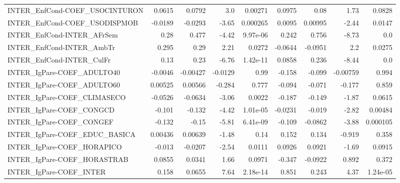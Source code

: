 \begin{tabular}{lrrrrrrrr}
INTER\_EnfCond-COEF\_USOCINTURON        &      0.0615 &       0.0792 &     3.0 &  0.00271 &     0.0975 &        0.08 &         1.73 &        0.0828 \\
INTER\_EnfCond-COEF\_USODISPMOB         &     -0.0189 &      -0.0293 &   -3.65 & 0.000265 &     0.0095 &     0.00995 &        -2.44 &        0.0147 \\
INTER\_EnfCond-INTER\_AFrSem            &        0.28 &        0.477 &   -4.42 & 9.97e-06 &      0.242 &       0.756 &        -8.73 &           0.0 \\
INTER\_EnfCond-INTER\_AmbTr             &       0.295 &         0.29 &    2.21 &   0.0272 &    -0.0644 &     -0.0951 &          2.2 &        0.0275 \\
INTER\_EnfCond-INTER\_CulFr             &        0.13 &         0.23 &   -6.76 & 1.42e-11 &     0.0858 &       0.236 &        -8.44 &           0.0 \\
INTER\_IgPare-COEF\_ADULTO40            &     -0.0046 &     -0.00427 & -0.0129 &     0.99 &     -0.158 &      -0.099 &     -0.00759 &         0.994 \\
INTER\_IgPare-COEF\_ADULTO60            &     0.00525 &      0.00566 &  -0.284 &    0.777 &     -0.094 &      -0.071 &       -0.177 &         0.859 \\
INTER\_IgPare-COEF\_CLIMASECO           &     -0.0526 &      -0.0634 &   -3.06 &   0.0022 &     -0.187 &      -0.149 &        -1.87 &        0.0615 \\
INTER\_IgPare-COEF\_CONGCD              &      -0.101 &       -0.132 &   -4.42 & 1.01e-05 &    -0.0231 &      -0.019 &        -2.82 &       0.00484 \\
INTER\_IgPare-COEF\_CONGEF              &      -0.132 &        -0.15 &   -5.81 & 6.41e-09 &     -0.109 &     -0.0862 &        -3.88 &      0.000105 \\
INTER\_IgPare-COEF\_EDUC\_BASICA         &     0.00436 &      0.00639 &   -1.48 &     0.14 &      0.152 &       0.134 &       -0.919 &         0.358 \\
INTER\_IgPare-COEF\_HORAPICO            &      -0.013 &      -0.0207 &   -2.54 &   0.0111 &     0.0926 &      0.0921 &        -1.69 &        0.0915 \\
INTER\_IgPare-COEF\_HORASTRAB           &      0.0855 &       0.0341 &    1.66 &   0.0971 &     -0.347 &     -0.0922 &        0.892 &         0.372 \\
INTER\_IgPare-COEF\_INTER               &       0.158 &       0.0655 &    7.64 & 2.18e-14 &      0.851 &       0.243 &         4.37 &      1.24e-05 \\

\end{tabular}
